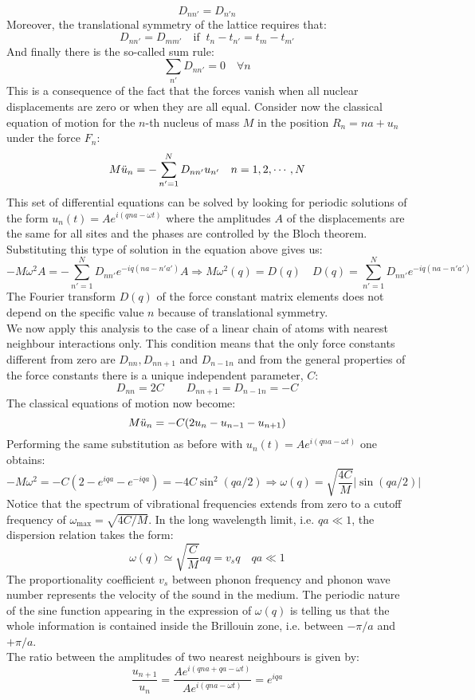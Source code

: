 \documentclass[10.75pt,a4paper,openright,bottom=2cm]{article}
\begin{document}
\[
D_{nn'}=D_{n'n}
\]
Moreover, the translational symmetry of the lattice requires that:
\[
D_{nn'}=D_{mm'} \quad \text{if}\;\; t_n-t_{n'}=t_m-t_{m'}
\]
And finally there is the so-called sum rule:
\[
\sum_{n'}D_{nn'}=0 \quad \forall n
\]
This is a consequence of the fact that the forces vanish when all nuclear displacements are zero or when they are all equal. Consider now the classical equation of motion for the $n$-th nucleus of mass $M$ in the position $R_n=na+u_n$ under the force $F_n$:
\[
M\Ddot{u}_n=-\sum_{n'=1}^ND_{nn'}u_{n'} \quad n=1,2,\cdots,N
\]
This set of differential equations can be solved by looking for periodic solutions of the form $u_n(t)=Ae^{i(qna-\omega t)}$ where the amplitudes $A$ of the displacements are the same for all sites and the phases are controlled by the Bloch theorem. Substituting this type of solution in the equation above gives us:
\[
-M\omega^2A=-\sum_{n'=1}^ND_{nn'}e^{-iq(na-n'a')}A\Rightarrow M\omega^2(q)=D(q) \quad D(q)=\sum_{n'=1}^ND_{nn'}e^{-iq(na-n'a')}
\]
The Fourier transform $D(q)$ of the force constant matrix elements does not depend on the specific value $n$ because of translational symmetry.\\
We now apply this analysis to the case of a linear chain of atoms with nearest neighbour interactions only. This condition means that the only force constants different from zero are $D_{nn}, D_{nn+1}$ and $D_{n-1n}$ and from the general properties of the force constants there is a unique independent parameter, $C$:
\[
D_{nn}=2C \qquad D_{nn+1}=D_{n-1n}=-C
\]
The classical equations of motion now become:
\[
M\Ddot{u}_n=-C(2u_n-u_{n-1}-u_{n+1})
\]
Performing the same substitution as before with $u_n(t)=Ae^{i(qna-\omega t)}$ one obtains:
\[
-M\omega^2=-C(2-e^{iqa}-e^{-iqa})=-4C\sin^2(qa/2)\Rightarrow\omega(q)=\sqrt{\frac{4C}{M}}|\sin(qa/2)|
\]
Notice that the spectrum of vibrational frequencies extends from zero to a cutoff frequency of $\omega_{\max}=\sqrt{4C/M}$. In the long wavelength limit, i.e. $qa\ll1$, the dispersion relation takes the form:
\[
\omega(q)\simeq\sqrt{\frac{C}{M}}aq=v_sq \quad qa\ll1
\]
The proportionality coefficient $v_s$ between phonon frequency and phonon wave number represents the velocity of the sound in the medium. The periodic nature of the sine function appearing in the expression of $\omega(q)$ is telling us that the whole information is contained inside the  Brillouin zone, i.e. between $-\pi/a$ and $+\pi/a$.\\
The ratio between the amplitudes of two nearest neighbours is given by:
\[
\frac{u_{n+1}}{u_n}=\frac{Ae^{i(qna+qa-\omega t)}}{Ae^{i(qna-\omega t)}}=e^{iqa}
\]
\end{document}
